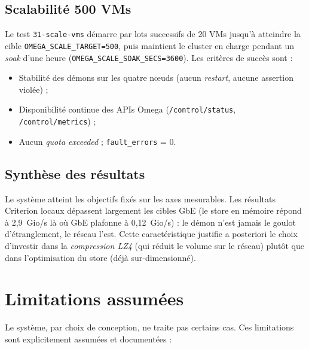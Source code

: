 \subsection{Scalabilité 500 VMs}

Le test \texttt{31-scale-vms} démarre par lots successifs de 20 VMs jusqu'à atteindre la cible \texttt{OMEGA\_SCALE\_TARGET=500}, puis maintient le cluster en charge pendant un \emph{soak} d'une heure (\texttt{OMEGA\_SCALE\_SOAK\_SECS=3600}). Les critères de succès sont :
\begin{itemize}[leftmargin=*]
    \item Stabilité des démons sur les quatre nœuds (aucun \emph{restart}, aucune assertion violée) ;
    \item Disponibilité continue des APIs Omega (\texttt{/control/status}, \texttt{/control/metrics}) ;
    \item Aucun \emph{quota exceeded} ; \texttt{fault\_errors} = 0.
\end{itemize}

\subsection{Synthèse des résultats}

Le système atteint les objectifs fixés sur les axes mesurables. Les résultats Criterion locaux dépassent largement les cibles GbE (le store en mémoire répond à 2,9~Gio/s là où GbE plafonne à 0,12~Gio/s) : le démon n'est jamais le goulot d'étranglement, le réseau l'est. Cette caractéristique justifie a posteriori le choix d'investir dans la \emph{compression LZ4} (qui réduit le volume sur le réseau) plutôt que dans l'optimisation du store (déjà sur-dimensionné).

\section{Limitations assumées}
\label{sec:limitations}

Le système, par choix de conception, ne traite pas certains cas. Ces limitations sont explicitement assumées et documentées :

